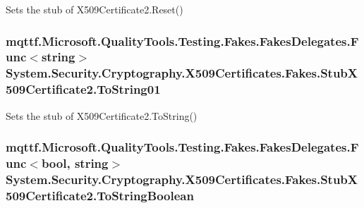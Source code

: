 Sets the stub of X509\-Certificate2.\-Reset()

\hypertarget{class_system_1_1_security_1_1_cryptography_1_1_x509_certificates_1_1_fakes_1_1_stub_x509_certificate2_a4ea292d363d6eba85f9caff9245d7b9a}{
\subsubsection[{To\-String01}]{\setlength{\rightskip}{0pt plus 5cm}mqttf.\-Microsoft.\-Quality\-Tools.\-Testing.\-Fakes.\-Fakes\-Delegates.\-Func$<$string$>$ System.\-Security.\-Cryptography.\-X509\-Certificates.\-Fakes.\-Stub\-X509\-Certificate2.\-To\-String01}}\label{class_system_1_1_security_1_1_cryptography_1_1_x509_certificates_1_1_fakes_1_1_stub_x509_certificate2_a4ea292d363d6eba85f9caff9245d7b9a}


Sets the stub of X509\-Certificate2.\-To\-String()

\hypertarget{class_system_1_1_security_1_1_cryptography_1_1_x509_certificates_1_1_fakes_1_1_stub_x509_certificate2_a3e4dbc90fecc53cb126bb2bd852cafcb}{
\subsubsection[{To\-String\-Boolean}]{\setlength{\rightskip}{0pt plus 5cm}mqttf.\-Microsoft.\-Quality\-Tools.\-Testing.\-Fakes.\-Fakes\-Delegates.\-Func$<$bool, string$>$ System.\-Security.\-Cryptography.\-X509\-Certificates.\-Fakes.\-Stub\-X509\-Certificate2.\-To\-String\-Boolean}}\label{class_system_1_1_security_1_1_cryptography_1_1_x509_certificates_1_1_fakes_1_1_stub_x509_certificate2_a3e4dbc90fecc53cb126bb2bd852cafcb}


